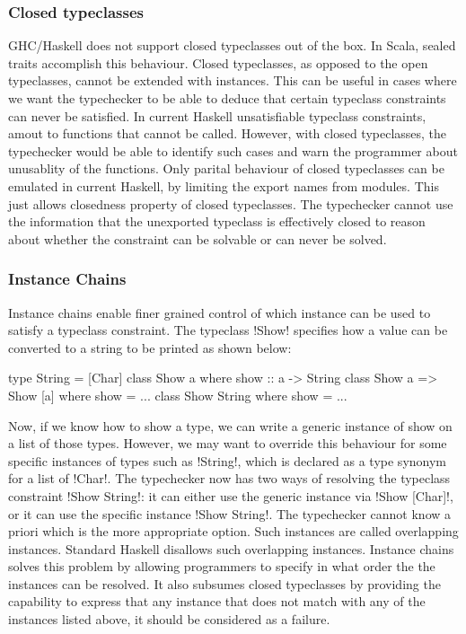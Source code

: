 \documentclass[screen,nonacm,manuscript,review]{acmart} %
\begin{document}
\subsubsection{Closed typeclasses}
GHC/Haskell does not support closed typeclasses out of the box. In Scala, sealed traits accomplish this behaviour. Closed typeclasses, as opposed to the open typeclasses, cannot be extended with instances. This can be useful in cases where we want the typechecker to be able to deduce that certain typeclass constraints can never be satisfied. In current Haskell unsatisfiable typeclass constraints, amout to functions that cannot be called. However, with closed typeclasses, the typechecker would be able to identify such cases and warn the programmer about unusablity of the functions. Only parital behaviour of closed typeclasses can be emulated in current Haskell, by limiting the export names from modules. This just allows closedness property of closed typeclasses. The typechecker cannot use the information that the unexported typeclass is effectively closed to reason about whether the constraint can be solvable or can never be solved.

\subsubsection{Instance Chains}
Instance chains\cite{morris_instance_2010} enable finer grained control of which instance can be used to satisfy a typeclass constraint. The typeclass !Show! specifies how a value can be converted to a string to be printed as shown below:

\begin{CenteredBox}
\begin{code}
type String = [Char]
class Show a where show :: a -> String
class Show a => Show [a] where show = ...
class Show String where show = ...
\end{code}
\end{CenteredBox}
Now, if we know how to show a type, we can write a generic instance of
show on a list of those types. However, we may want to override this
behaviour for some specific instances of types such as !String!, which
is declared as a type synonym for a list of !Char!. The typechecker
now has two ways of resolving the typeclass constraint !Show String!:
it can either use the generic instance via !Show [Char]!, or it can
use the specific instance !Show String!. The typechecker cannot know a
priori which is the more appropriate option. Such instances are called
overlapping instances. Standard Haskell disallows such overlapping
instances. Instance chains solves this problem by allowing programmers
to specify in what order the the instances can be resolved. It also
subsumes closed typeclasses by providing the capability to express
that any instance that does not match with any of the instances listed
above, it should be considered as a failure.
\end{document}
